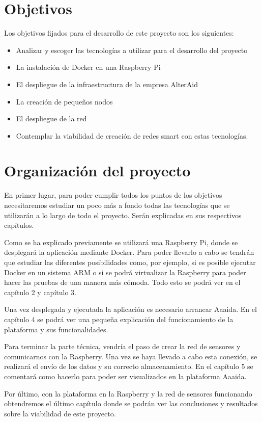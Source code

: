 \section{Objetivos}

Los objetivos fijados para el desarrollo de este proyecto son los siguientes:

\begin{itemize}
\item Analizar y escoger las tecnologías a utilizar para el desarrollo del proyecto
\item La instalación de Docker en una Raspberry Pi
\item El despliegue de la infraestructura de la empresa AlterAid
\item La creación de pequeños nodos
\item El despliegue de la red
\item Contemplar la viabilidad de creación de redes smart con estas tecnologías. 
\end{itemize}

\section{Organización del proyecto}

En primer lugar, para poder cumplir todos los puntos de los objetivos necesitaremos estudiar un poco más a fondo todas las tecnologías que se utilizarán a lo largo de todo el proyecto. Serán explicadas en sus respectivos capítulos.

Como se ha explicado previamente se utilizará una Raspberry Pi, donde se desplegará la aplicación mediante Docker. Para poder llevarlo a cabo se tendrán que estudiar las diferentes posibilidades como, por ejemplo, si es posible ejecutar Docker en un sistema ARM o si se podrá virtualizar la Raspberry para poder hacer las pruebas de una manera más cómoda. Todo esto se podrá ver en el capítulo 2 y capítulo 3.

Una vez desplegada y ejecutada la aplicación es necesario arrancar Aaaida. En el capítulo 4 se podrá ver una pequeña explicación del funcionamiento de la plataforma y sus funcionalidades. 

Para terminar la parte técnica, vendría el paso de crear la red de sensores y
comunicarnos con la Raspberry. Una vez se haya llevado a cabo esta conexión, se realizará el envío de los datos y su correcto almacenamiento. En el capítulo 5 se comentará como hacerlo para poder ser visualizados en la plataforma Aaaida. 

Por último, con la plataforma en la Raspberry y la red de sensores funcionando obtendremos el último capítulo donde se podrán ver las conclusiones y resultados sobre la viabilidad de este proyecto.
